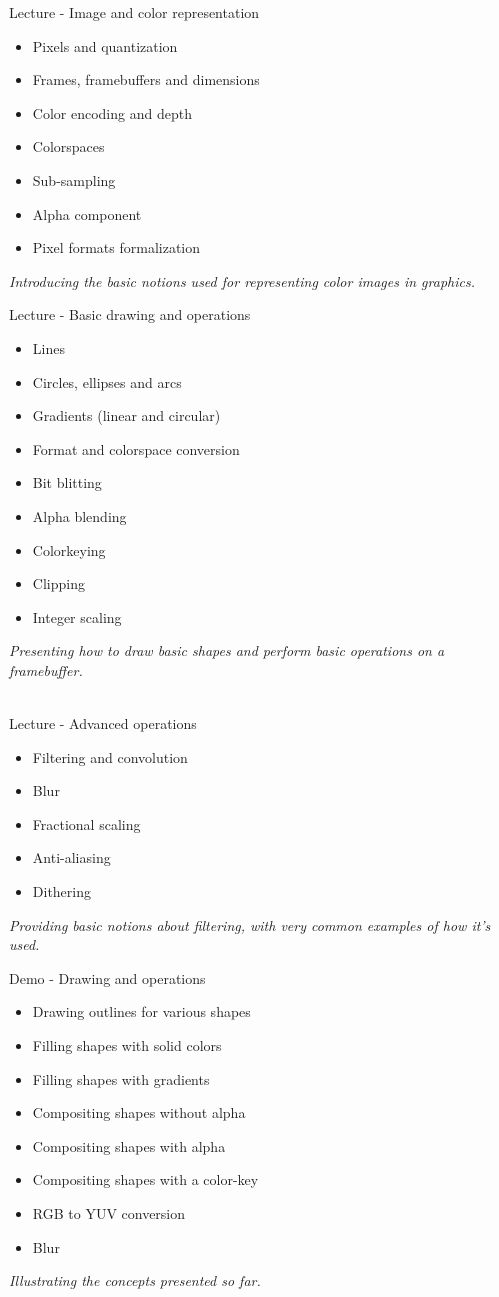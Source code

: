 \documentclass[a4paper,12pt,obeyspaces,spaces,hyphens]{article}
\begin{document}
\feagendatwocolumn
{Lecture - Image and color representation}
{
  \begin{itemize}
  \item Pixels and quantization
  \item Frames, framebuffers and dimensions
  \item Color encoding and depth
  \item Colorspaces
  \item Sub-sampling
  \item Alpha component
  \item Pixel formats formalization
  \end{itemize}
  \vspace{0.5em}
  {\em Introducing the basic notions used for representing color images in graphics.}
}
{Lecture - Basic drawing and operations}
{
  \begin{itemize}
  \item Lines
  \item Circles, ellipses and arcs
  \item Gradients (linear and circular)
  \item Format and colorspace conversion
  \item Bit blitting
  \item Alpha blending
  \item Colorkeying
  \item Clipping
  \item Integer scaling
  \end{itemize}
  \vspace{0.5em}
  {\em Presenting how to draw basic shapes and perform basic operations on a framebuffer.}
}
\\
\feagendatwocolumn
{Lecture - Advanced operations}
{
  \begin{itemize}
  \item Filtering and convolution
  \item Blur
  \item Fractional scaling
  \item Anti-aliasing
  \item Dithering
  \end{itemize}
  \vspace{0.5em}
  {\em Providing basic notions about filtering, with very common examples of how it's used.}
}
{Demo - Drawing and operations}
{
  \begin{itemize}
  \item Drawing outlines for various shapes
  \item Filling shapes with solid colors
  \item Filling shapes with gradients
  \item Compositing shapes without alpha
  \item Compositing shapes with alpha
  \item Compositing shapes with a color-key
  \item RGB to YUV conversion
  \item Blur
  \end{itemize}
  \vspace{0.5em}
  {\em Illustrating the concepts presented so far.}
}
\end{document}
